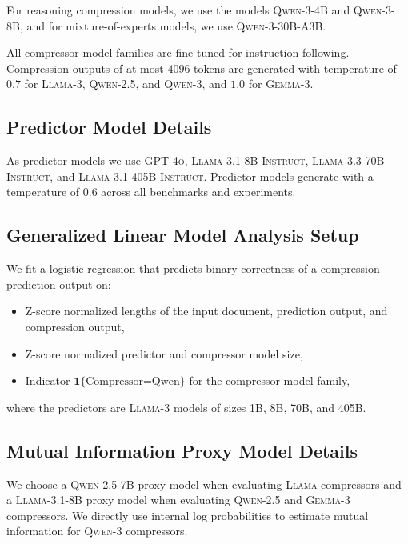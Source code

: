 \documentclass{article} %
\begin{document}
For reasoning compression models, we use the models \textsc{Qwen-3-4B} and \textsc{Qwen-3-8B}, and for mixture-of-experts models, we use \textsc{Qwen-3-30B-A3B}.

All compressor model families are fine-tuned for instruction following. Compression outputs of at most $4096$ tokens are generated with temperature of $0.7$ for \textsc{Llama-3}, \textsc{Qwen-2.5}, and \textsc{Qwen-3}, and $1.0$ for \textsc{Gemma-3}. 

\subsection{Predictor Model Details}
\label{sec:appendix-supervisor-model}
As predictor models we use \textsc{GPT-4o}, \textsc{Llama-3.1-8B-Instruct}, \textsc{Llama-3.3-70B-Instruct}, and \textsc{Llama-3.1-405B-Instruct}. Predictor models generate with a temperature of $0.6$ across all benchmarks and experiments.

\subsection{Generalized Linear Model Analysis Setup}
\label{sec:appendix-glm-analysis}

We fit a logistic regression that predicts binary correctness of a compression-prediction output on: 
\begin{itemize}[leftmargin=*]
    \item Z-score normalized lengths of the input document, prediction output, and compression output,
    \item Z-score normalized predictor and compressor model size,
    \item Indicator \(\mathbf{1}\{\text{Compressor=Qwen}\}\) for the compressor model family,
\end{itemize}
where the predictors are \textsc{Llama-3} models of sizes 1B, 8B, 70B, and 405B.

\subsection{Mutual Information Proxy Model Details}
\label{sec:appendix-proxy-model-details}
We choose a \textsc{Qwen-2.5-7B} proxy model when evaluating \textsc{Llama} compressors and a \textsc{Llama-3.1-8B} proxy model when evaluating \textsc{Qwen-2.5} and \textsc{Gemma-3} compressors. We directly use internal log probabilities to estimate mutual information for \textsc{Qwen-3} compressors.
\end{document}
